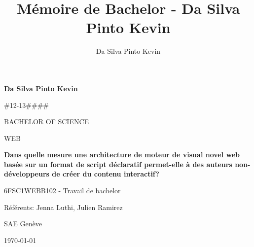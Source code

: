\documentclass[12pt]{article}
\title{Mémoire de Bachelor - Da Silva Pinto Kevin}
\author{Da Silva Pinto Kevin}
\begin{document}
\begin{titlepage}
    \begin{center}
        \vspace*{1cm}

        \textbf{Da Silva Pinto Kevin}

        \#12-13\#\#\#\#

        \vspace*{1cm}
            
        BACHELOR OF SCIENCE

        WEB
            
        \vspace{5cm}

        \begin{mdframed}
            \begin{center}
                \textbf{Dans quelle mesure une architecture de moteur de visual novel web basée sur un format de script déclaratif permet-elle à des auteurs non-développeurs de créer du contenu interactif?}
            \end{center}
        \end{mdframed}
            
        \vspace{1.5cm}

        6FSC1WEBB102 - Travail de bachelor

        Référents: Jenna Luthi, Julien Ramirez
        
        \vfill

        SAE Genève

        \today
            
    \end{center}
\end{titlepage}


\clearpage


\clearpage


\clearpage

\tableofcontents
\clearpage

\listoffigures
\listoftables
\listoflistings

\printglossaries
\clearpage



\end{document}
